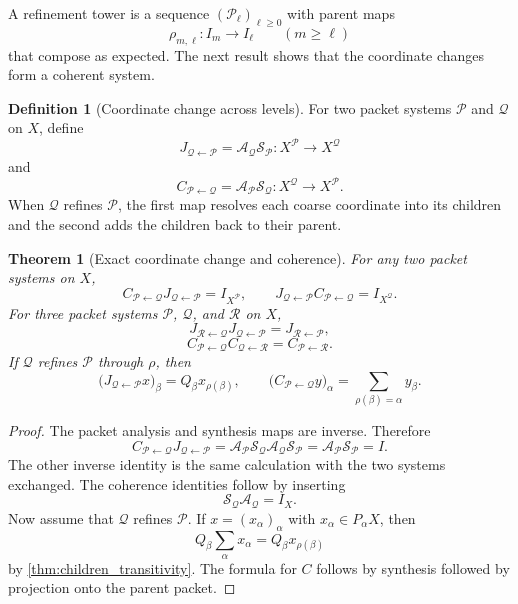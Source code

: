 \documentclass[11pt,a4paper]{article}
\newtheorem{theorem}{Theorem}[section]
\theoremstyle{definition}
\newtheorem{definition}[definition]{Definition}
\theoremstyle{remark}
\newcommand{\Acal}{\mathcal A}
\newcommand{\Pcal}{\mathcal P}
\newcommand{\Qcal}{\mathcal Q}
\newcommand{\Scal}{\mathcal S}
\newcommand{\Rcal}{\mathcal R}
\theoremstyle{definition}\newtheorem{construction}[theorem]{Construction}\newtheorem{certificate}[theorem]{Numerical Certificate}
\theoremstyle{remark}\newtheorem{boundary}[theorem]{Boundary}
\begin{document}
A refinement tower is a sequence $(\Pcal_\ell)_{\ell\geq0}$ with parent maps
\[
\rho_{m,\ell}:I_m\longrightarrow I_\ell
\qquad(m\geq\ell)
\]
that compose as expected.  The next result shows that the coordinate changes form a coherent system.

\begin{definition}[Coordinate change across levels]\label{def:coordinate_change}\label{def:coordinate-refinement}
For two packet systems $\Pcal$ and $\Qcal$ on $X$, define
\[
J_{\Qcal\leftarrow\Pcal}
=
\Acal_{\Qcal}\Scal_{\Pcal}:X^{\Pcal}\longrightarrow X^{\Qcal}
\]
and
\[
C_{\Pcal\leftarrow\Qcal}
=
\Acal_{\Pcal}\Scal_{\Qcal}:X^{\Qcal}\longrightarrow X^{\Pcal}.
\]
When $\Qcal$ refines $\Pcal$, the first map resolves each coarse coordinate into its children and the second adds the children back to their parent.
\end{definition}

\begin{theorem}[Exact coordinate change and coherence]\label{thm:coordinate_coherence}\label{prop:perfect-reconstruction}
For any two packet systems on $X$,
\[
C_{\Pcal\leftarrow\Qcal}J_{\Qcal\leftarrow\Pcal}=I_{X^{\Pcal}},
\qquad
J_{\Qcal\leftarrow\Pcal}C_{\Pcal\leftarrow\Qcal}=I_{X^{\Qcal}}.
\]
For three packet systems $\Pcal$, $\Qcal$, and $\Rcal$ on $X$,
\[
J_{\Rcal\leftarrow\Qcal}J_{\Qcal\leftarrow\Pcal}
=
J_{\Rcal\leftarrow\Pcal},
\]
\[
C_{\Pcal\leftarrow\Qcal}C_{\Qcal\leftarrow\Rcal}
=
C_{\Pcal\leftarrow\Rcal}.
\]
If $\Qcal$ refines $\Pcal$ through $\rho$, then
\[
\bigl(J_{\Qcal\leftarrow\Pcal}x\bigr)_\beta
=
Q_\beta x_{\rho(\beta)},
\qquad
\bigl(C_{\Pcal\leftarrow\Qcal}y\bigr)_\alpha
=
\sum_{\rho(\beta)=\alpha}y_\beta.
\]
\end{theorem}

\begin{proof}
The packet analysis and synthesis maps are inverse.  Therefore
\[
C_{\Pcal\leftarrow\Qcal}J_{\Qcal\leftarrow\Pcal}
=
\Acal_{\Pcal}\Scal_{\Qcal}\Acal_{\Qcal}\Scal_{\Pcal}
=
\Acal_{\Pcal}\Scal_{\Pcal}
=
I.
\]
The other inverse identity is the same calculation with the two systems exchanged.  The coherence identities follow by inserting
\[
\Scal_{\Qcal}\Acal_{\Qcal}=I_X.
\]
Now assume that $\Qcal$ refines $\Pcal$.  If $x=(x_\alpha)_\alpha$ with $x_\alpha\in P_\alpha X$, then
\[
Q_\beta\sum_\alpha x_\alpha
=
Q_\beta x_{\rho(\beta)}
\]
by \cref{thm:children_transitivity}.  The formula for $C$ follows by synthesis followed by projection onto the parent packet.
\end{proof}
\end{document}
